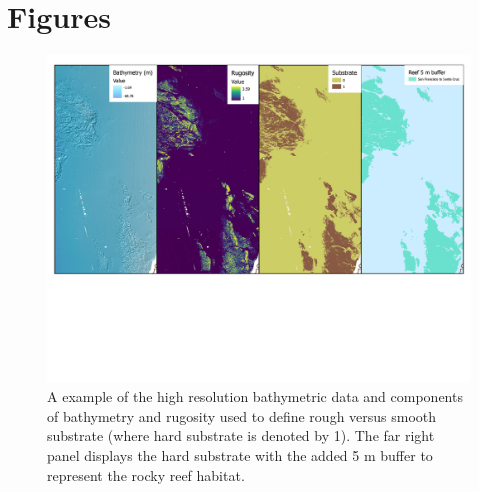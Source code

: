 \documentclass[
  12pt,
  authoryear,
  preprint,
  3p]{elsarticle}
\begin{document}
\FloatBarrier

\hypertarget{figures}{%
\section{Figures}\label{figures}}

\begin{figure}

{\centering \includegraphics{figures/map_2.jpg}

}

\caption{\label{fig-map2}A example of the high resolution bathymetric
data and components of bathymetry and rugosity used to define rough
versus smooth substrate (where hard substrate is denoted by 1). The far
right panel displays the hard substrate with the added 5 m buffer to
represent the rocky reef habitat.}

\end{figure}
\end{document}
